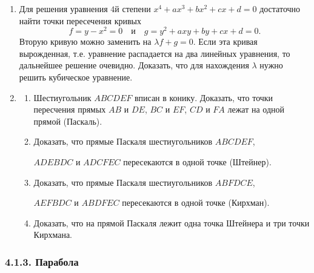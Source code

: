 \begin{enumerate}[resume*]
	\item Для решения уравнения $4$й степени $x^4 + ax^3 + bx^2 + cx + d = 0$ достаточно найти точки пересечения кривых
	\[
		f = y - x^2 = 0 \quad \text{и} \quad g = y^2 + axy + by + cx + d = 0.
	\]
	Вторую кривую можно заменить на $\lambda f + g = 0$. Если эта кривая вырожденная, т.е. уравнение распадается на два линейных уравнения, то дальнейшее решение очевидно. Доказать, что для нахождения $\lambda$ нужно решить кубическое уравнение.

	\item
	\begin{enumerate}
		\item Шестиугольник $ABCDEF$ вписан в конику. Доказать, что точки пересчения прямых $AB$ и $DE$, $BC$ и $EF$, $CD$ и $FA$ лежат на одной прямой (Паскаль). 
		\item Доказать, что прямые Паскаля шестиугольников $ABCDEF$,

			$ADEBDC$ и $ADCFEC$ пересекаются в одной точке (Штейнер).
		\item Доказать, что прямые Паскаля шестиугольников $ABFDCE$,

			$AEFBDC$ и $ABDFEC$ пересекаются в одной точке (Кирхман).
		\item Доказать, что на прямой Паскаля лежит одна точка Штейнера и три точки Кирхмана.
	\end{enumerate}

\end{enumerate}

\subsubsection*{4.1.3. Парабола}

